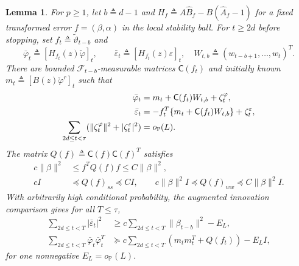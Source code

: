 \documentclass[11pt,reqno]{amsart}
\numberwithin{equation}{section}
\newtheorem{lemma}[theorem]{Lemma}
\theoremstyle{definition}
\theoremstyle{remark}
\newcommand{\Prob}{\mathbb P}
\newcommand{\F}{\mathcal F}
\newcommand{\ph}{\varphi}
\newcommand{\phc}{\check{\varphi}}
\newcommand{\etac}{\widetilde{\vartheta}}
\begin{document}
\begin{lemma}\label{lem:annihilator}
For $p\ge1$, let $b\triangleq d-1$ and
$H_f\triangleq A\widehat B_f-B(\widehat A_f-1)$ for a fixed transformed
error $f=(\beta,\alpha)$ in the local stability ball. For $t\ge2d$ before stopping, set $f_t\triangleq\etac_{t-b}$ and
\[
 \bar\ph_t\triangleq[H_{f_t}(z)\phc]_t,
 \qquad \bar\varepsilon_t\triangleq[H_{f_t}(z)\varepsilon]_t,
 \quad W_{t,b}\triangleq(w_{t-b+1},\ldots,w_t)^T.
\]
There are bounded $\F_{t-b}$-measurable matrices $\mathsf C(f_t)$ and initially known $m_t\triangleq[B(z)\phc^r]_t$ such that
\begin{align}
 \bar\ph_t&=m_t+\mathsf C(f_t)W_{t,b}+\zeta_t^\ph,
 \label{eq:annihilator}\\
 \bar\varepsilon_t&=-f_t^T\{m_t+\mathsf C(f_t)W_{t,b}\}
                    +\zeta_t^\varepsilon,
 \notag\\
 \sum_{2d\le t<\tau}(\|\zeta_t^\ph\|^2+|\zeta_t^\varepsilon|^2)
  &=o_{\Prob}(L).\label{eq:annihilatorerror}
\end{align}
The matrix $Q(f)\triangleq \mathsf C(f)\mathsf C(f)^T$ satisfies
\begin{align}
 c\|\beta\|^2&\le f^T Q(f)f\le C\|\beta\|^2,
 \label{eq:annihilatorresgain}\\
 cI&\preceq Q(f)_{ss}\preceq CI,\qquad
 c\|\beta\|^2I\preceq Q(f)_{ww}\preceq C\|\beta\|^2I.
 \label{eq:annihilatorQ}
\end{align}
With arbitrarily high conditional probability, the augmented innovation comparison gives for all $T\le\tau$,
\begin{align}
 \sum_{2d\le t<T}|\bar\varepsilon_t|^2
 &\ge c\sum_{2d\le t<T}\|\beta_{t-b}\|^2-E_L,
 \label{eq:jointresidual}\\
 \sum_{2d\le t<T}\bar\ph_t\bar\ph_t^T
 &\succeq c\sum_{2d\le t<T}(m_tm_t^T+Q(f_t))-E_LI,
 \label{eq:jointgram}
\end{align}
for one nonnegative $E_L=o_{\Prob}(L)$.
\end{lemma}
\end{document}
